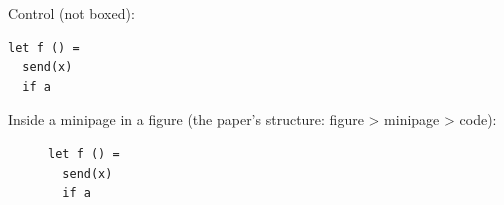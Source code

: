 \documentclass{article}
\begin{document}
Control (not boxed):
\begin{lstlisting}
let f () =
  send(x)
  if a
\end{lstlisting}

Inside a minipage in a figure (the paper's structure: figure > minipage > code):
\begin{figure}
\begin{minipage}{0.3\textwidth}
\begin{lstlisting}
let f () =
  send(x)
  if a
\end{lstlisting}
\end{minipage}
\end{figure}
\end{document}
